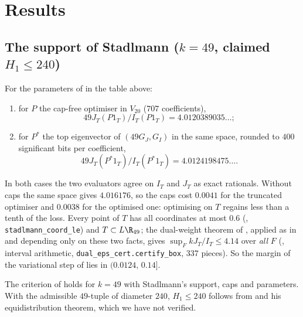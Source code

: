 \section{Results}

\subsection*{The support of Stadlmann ($k=49$, claimed $H_1\le240$)}

\begin{theorem}\label{thm:240}
For the parameters of \cite{Sta26} in the table above:
\begin{enumerate}
\item for $P$ the cap-free optimiser in $V_{20}$ ($707$ coefficients),
\[49J_T(P1_T)/I_T(P1_T)=4.0120389035\ldots;\]
\item for $P^\ast$ the top eigenvector of $(49G_J,G_I)$ in the same space,
rounded to $400$ significant bits per coefficient,
\[49J_T(P^\ast1_T)/I_T(P^\ast1_T)=4.0124198475\ldots.\]
\end{enumerate}
\end{theorem}

In both cases the two evaluators agree on $I_T$ and $J_T$ as exact rationals.
Without caps the same space gives $4.016176$, so the caps cost $0.0041$ for the
truncated optimiser and $0.0038$ for the optimised one: optimising on $T$
regains less than a tenth of the loss. Every point of $T$ has all
coordinates at most $0.6$ (, \texttt{stadlmann\_coord\_le})
and $T\subset L\R_{49}$; the dual-weight theorem of \cite[\S4]{Kim26},
applied as in \cite[\S5]{Kim26} and depending only on these two facts, gives
$\sup_FkJ_T/I_T\le4.14$ over \emph{all} $F$ (, interval
arithmetic, \texttt{dual\_eps\_cert.certify\_box}, $337$ pieces). So the
margin of the variational step of \cite{Sta26} lies in $(0.0124,\,0.14]$.

\begin{corollary}
The criterion of \cite[Prop.~1]{Sta26} holds for $k=49$ with Stadlmann's
support, caps and parameters. With the  admissible
$49$-tuple of diameter $240$, $H_1\le240$ follows from \cite[Prop.~1]{Sta26}
and his equidistribution theorem, which we have not verified.
\end{corollary}

